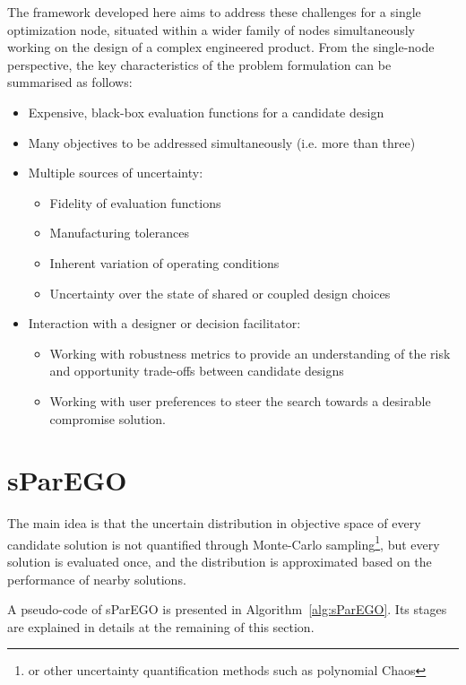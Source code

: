 \documentclass[10pt]{llncs}
\begin{document}
The framework developed here aims to address these challenges for a single optimization node, situated within a wider family of nodes simultaneously working on the design of a complex engineered product. From the single-node perspective, the key characteristics of the problem formulation can be summarised as follows: 
\begin{itemize}
	\item Expensive, black-box evaluation functions for a candidate design
	\item Many objectives to be addressed simultaneously (i.e. more than three)
	\item Multiple sources of uncertainty:
		\begin{itemize}
			\item Fidelity of evaluation functions
			\item Manufacturing tolerances
			\item Inherent variation of operating conditions
			\item Uncertainty over the state of shared or coupled design choices
		\end{itemize}
	\item Interaction with a designer or decision facilitator:
		\begin{itemize}
			\item Working with robustness metrics to provide an understanding of the risk and 						  opportunity trade-offs between candidate designs
			\item Working with user preferences to steer the search towards a desirable 				 	 		  compromise solution.
		\end{itemize}
\end{itemize}


\section{sParEGO}
The main idea is that the uncertain distribution in objective space of every candidate solution is not quantified through Monte-Carlo sampling\footnote{or other uncertainty quantification methods such as polynomial Chaos}, but every solution is evaluated once, and the distribution is approximated based on the performance of nearby solutions.

A pseudo-code of sParEGO is presented in Algorithm~\ref{alg:sParEGO}.
Its stages are explained in details at the remaining of this section.
\end{document}
